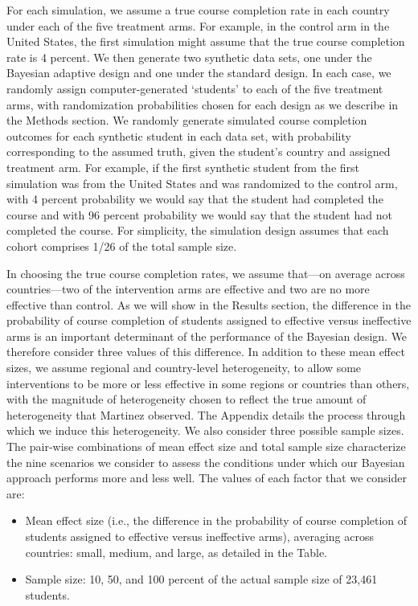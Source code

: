 \documentclass{acm_proc_article-sp}
\begin{document}
For each simulation, we assume a true course completion rate in each country under each of the five treatment arms. For example, in the control arm in the United States, the first simulation might assume that the true course completion rate is 4 percent. We then generate two synthetic data sets, one under the Bayesian adaptive design and one under the standard design. In each case, we randomly assign computer-generated ‘students’ to each of the five treatment arms, with randomization probabilities chosen for each design as we describe in the Methods section. We randomly generate simulated course completion outcomes for each synthetic student in each data set, with probability corresponding to the assumed truth, given the student’s country and assigned treatment arm. For example, if the first synthetic student from the first simulation was from the United States and was randomized to the control arm, with 4 percent probability we would say that the student had completed the course and with 96 percent probability we would say that the student had not completed the course. For simplicity, the simulation design assumes that each cohort comprises 1/26 of the total sample size.

In choosing the true course completion rates, we assume that—on average across countries—two of the intervention arms are effective and two are no more effective than control. As we will show in the Results section, the difference in the probability of course completion of students assigned to effective versus ineffective arms is an important determinant of the performance of the Bayesian design. We therefore consider three values of this difference. In addition to these mean effect sizes, we assume regional and country-level heterogeneity, to allow some interventions to be more or less effective in some regions or countries than others, with the magnitude of heterogeneity chosen to reflect the true amount of heterogeneity that Martinez observed. The Appendix details the process through which we induce this heterogeneity. We also consider three possible sample sizes. The pair-wise combinations of mean effect size and total sample size characterize the nine scenarios we consider to assess the conditions under which our Bayesian approach performs more and less well. The values of each factor that we consider are:
\begin{itemize}
    \item Mean effect size (i.e., the difference in the probability of course completion of students assigned to effective versus ineffective arms), averaging across countries: small, medium, and large, as detailed in the Table. 
    \item Sample size: 10, 50, and 100 percent of the actual sample size of 23,461 students.
\end{itemize}
\end{document}
